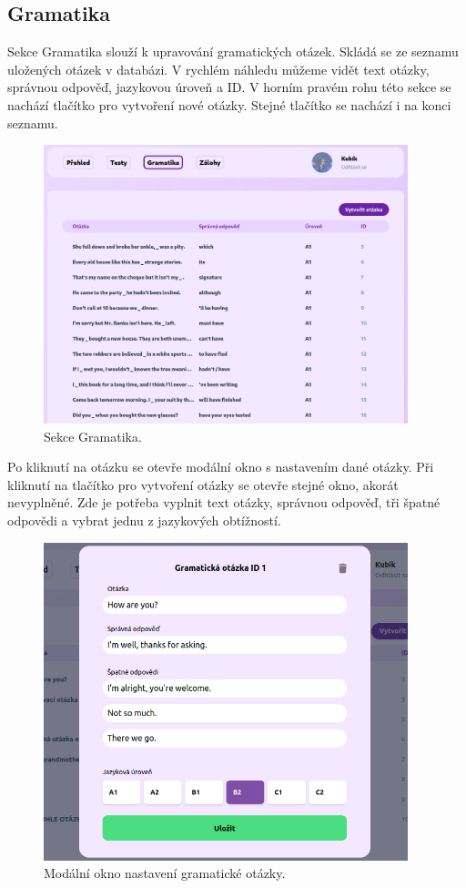 \pagebreak
\subsection{Gramatika}

Sekce Gramatika slouží k upravování gramatických otázek. Skládá se ze seznamu uložených otázek v databázi. V rychlém náhledu můžeme vidět text otázky, správnou odpověď, jazykovou úroveň a ID. V horním pravém rohu této sekce se nachází tlačítko pro vytvoření nové otázky. Stejné tlačítko se nachází i na konci seznamu.

\begin{figure}[H]
    \centering
    \includegraphics[width=400px]{images/01design/grammar.png}
    \caption{Sekce Gramatika.}
\end{figure}

Po kliknutí na otázku se otevře modální okno s nastavením dané otázky. Při kliknutí na tlačítko pro vytvoření otázky se otevře stejné okno, akorát nevyplněné. Zde je potřeba vyplnit text otázky, správnou odpověď, tři špatné odpovědi a vybrat jednu z jazykových obtížností. 

\begin{figure}[H]
    \centering
    \includegraphics[width=400px]{images/01design/question.png}
    \caption{Modální okno nastavení gramatické otázky.}
    \label{questionfill}
\end{figure}

